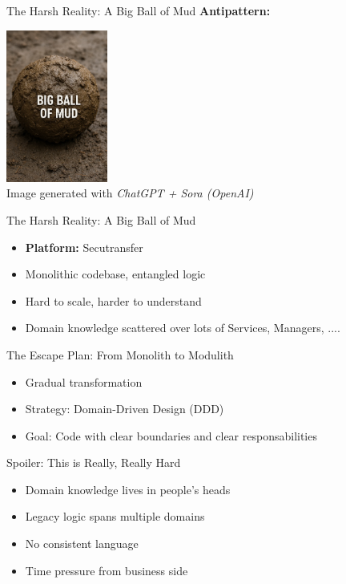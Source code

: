 \documentclass[aspectratio=169,12pt]{beamer}
\begin{document}
\begin{frame}{The Harsh Reality: A Big Ball of Mud}
    \textbf{Antipattern:}
    \begin{center}
        \includegraphics[width=0.25\textwidth]{./img/BBoM.png} \\
        \vspace{0.3cm}
        \tiny Image generated with \textit{ChatGPT + Sora (OpenAI)}
    \end{center}
\end{frame}
\begin{frame}{The Harsh Reality: A Big Ball of Mud}
\begin{itemize}
    \item \textbf{Platform:} Secutransfer
    \item Monolithic codebase, entangled logic
    \item Hard to scale, harder to understand
    \item Domain knowledge scattered over lots of Services, Managers, ....
\end{itemize}
\end{frame}

\begin{frame}{The Escape Plan: From Monolith to Modulith}
\begin{itemize}
    \item Gradual transformation
    \item Strategy: Domain-Driven Design (DDD)
    \item Goal: Code with clear boundaries and clear responsabilities
\end{itemize}
\end{frame}

\begin{frame}{Spoiler: This is Really, Really Hard}
\begin{itemize}
    \item Domain knowledge lives in people's heads
    \item Legacy logic spans multiple domains
    \item No consistent language
    \item Time pressure from business side
\end{itemize}
\end{frame}
\end{document}
